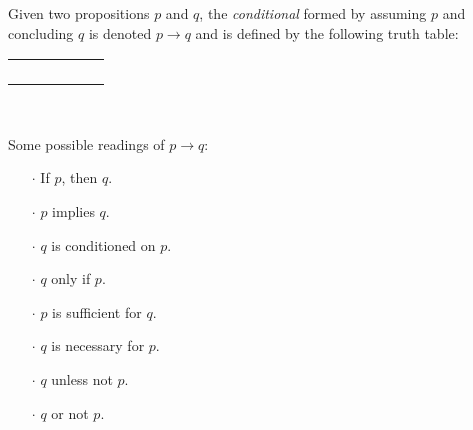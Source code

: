 \begin{definition}
    \begin{center}
        \begin{minipage}[t]{.55\linewidth}
            Given two propositions $p$ and $q$, the \emph{conditional} formed by assuming $p$ and concluding $q$
            is denoted $p \rightarrow q$ and is defined by the following truth table:
            \begin{table}[H]
                \centering
                \label{tab:implies}
                \begin{tabular}{|CcCc||Cc|}
                    \hline
                     &  &  \\ \hline
                    \thead{$\top$} & \thead{$\top$} &  \\
                    \thead{$\top$} & \thead{$\bot$} &  \\
                    \thead{$\bot$} & \thead{$\top$} &  \\
                    \thead{$\bot$} & \thead{$\bot$} &  \\ \hline
                \end{tabular}
            \end{table}
        \end{minipage}%
        \begin{minipage}[t]{.05\linewidth}
            ~
        \end{minipage}%
        \begin{minipage}[t]{.4\linewidth}
            Some possible readings of $p \rightarrow q$:\\
            \begin{itemize}
                \item[$\cdot$]
                    If $p$, then $q$.
                \item[$\cdot$]
                    $p$ implies $q$.
                \item[$\cdot$]
                    $q$ is conditioned on $p$.
                \item[$\cdot$]
                    $q$ only if $p$.
                \item[$\cdot$]
                    $p$ is sufficient for $q$.
                \item[$\cdot$]
                    $q$ is necessary for $p$.
                \item[$\cdot$]
                    $q$ unless not $p$.
                \item[$\cdot$]
                    $q$ or not $p$.
            \end{itemize}
        \end{minipage}
    \end{center}
\end{definition}

